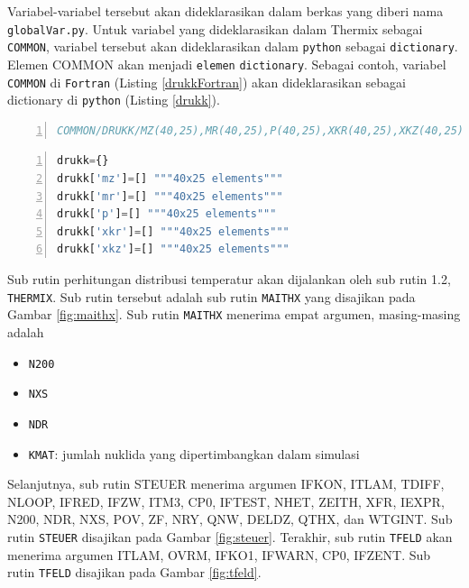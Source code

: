 \documentclass[a4paper,11pt]{report}
\begin{document}
Variabel-variabel tersebut akan dideklarasikan dalam berkas yang diberi nama \texttt{globalVar.py}. Untuk variabel yang dideklarasikan dalam Thermix sebagai \texttt{COMMON}, variabel tersebut akan dideklarasikan dalam \texttt{python} sebagai \texttt{dictionary}. Elemen COMMON akan menjadi \texttt{elemen} \texttt{dictionary}. Sebagai contoh, variabel \texttt{COMMON} di \texttt{Fortran} (Listing \ref{drukkFortran}) akan dideklarasikan sebagai dictionary di \texttt{python} (Listing \ref{drukk}).

\scriptsize
\begin{lstlisting}[language=fortran, numbers=left, numberstyle=\tiny, caption=Deklarasi variabel berjenis COMMON di Fortran, showstringspaces=false, label=drukkFortran]
COMMON/DRUKK/MZ(40,25),MR(40,25),P(40,25),XKR(40,25),XKZ(40,25)
\end{lstlisting}
\normalsize

\scriptsize
\begin{lstlisting}[language=python, numbers=left, numberstyle=\tiny, caption=Deklarasi variabel berjenis dictionary, showstringspaces=false, label=drukk]
drukk={}
drukk['mz']=[] """40x25 elements"""
drukk['mr']=[] """40x25 elements"""
drukk['p']=[] """40x25 elements"""
drukk['xkr']=[] """40x25 elements"""
drukk['xkz']=[] """40x25 elements"""
\end{lstlisting}
\normalsize

Sub rutin perhitungan distribusi temperatur akan dijalankan oleh sub rutin 1.2, \texttt{THERMIX}. Sub rutin tersebut adalah sub rutin \texttt{MAITHX} yang disajikan pada Gambar \ref{fig:maithx}. Sub rutin \texttt{MAITHX} menerima empat argumen, masing-masing adalah 
\begin{itemize}
  \item \texttt{N200}
  \item \texttt{NXS}
  \item \texttt{NDR}
  \item \texttt{KMAT}: jumlah nuklida yang dipertimbangkan dalam simulasi
\end{itemize}

Selanjutnya, sub rutin STEUER menerima argumen IFKON, ITLAM, TDIFF, NLOOP, IFRED, IFZW, ITM3, CP0, IFTEST, NHET, ZEITH, XFR, IEXPR, N200, NDR, NXS, POV, ZF, NRY, QNW, DELDZ, QTHX, dan WTGINT. Sub rutin \texttt{STEUER} disajikan pada Gambar \ref{fig:steuer}. Terakhir, sub rutin \texttt{TFELD} akan menerima argumen ITLAM, OVRM, IFKO1, IFWARN, CP0, IFZENT. Sub rutin \texttt{TFELD} disajikan pada Gambar \ref{fig:tfeld}.
\end{document}
